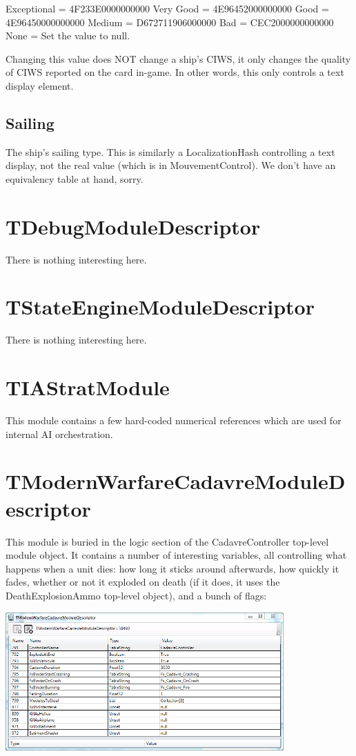 \documentclass{article}
\begin{document}
Exceptional = 4F233E0000000000
Very Good = 4E96452000000000
Good = 4E96450000000000
Medium = D672711906000000
Bad = CEC2000000000000
None = Set the value to null.

Changing this value does NOT change a ship's CIWS, it only changes the quality of CIWS reported on the card in-game. In other words, this only controls a text display element.

\subsection{Sailing}

The ship's sailing type. This is similarly a LocalizationHash controlling a text display, not the real value (which is in MouvementControl). We don't have an equivalency table at hand, sorry.

\section{TDebugModuleDescriptor}

There is nothing interesting here.

\section{TStateEngineModuleDescriptor}

There is nothing interesting here.

\section{TIAStratModule}

This module contains a few hard-coded numerical references which are used for internal AI orchestration.

\section{TModernWarfareCadavreModuleDescriptor}

This module is buried in the logic section of the CadavreController top-level module object. It contains a number of interesting variables, all controlling what happens when a unit dies: how long it sticks around afterwards, how quickly it fades, whether or not it exploded on death (if it does, it uses the DeathExplosionAmmo top-level object), and a bunch of flags:

\includegraphics[width=0.8\textwidth]{screenshot_cadavre}
\end{document}
